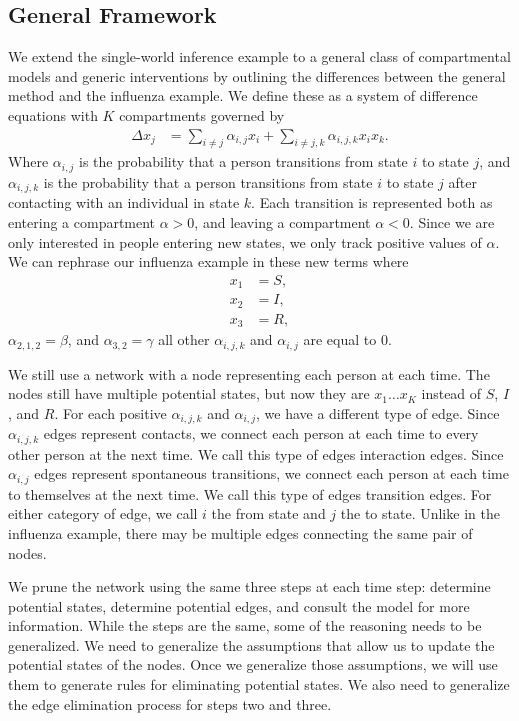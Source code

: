 \documentclass[PTRSB]{rsos}
\begin{document}
\begin{multicols}{2}
\subsection{General Framework}\label{subsection:general}

We extend the single-world inference example to a general class of compartmental models and generic interventions by outlining the differences between the general method and the influenza example.
We define these as a system of difference equations with $K$ compartments governed by 
\begin{align*}
\Delta x_{j} &= \sum_{i \neq j} \alpha_{i,j}x_i + \sum_{i \neq j, k} \alpha_{i,j,k} x_ix_k.
\end{align*}
Where $\alpha_{i,j}$ is the probability that a person transitions from state $i$ to state $j$, and $\alpha_{i,j,k}$ is the probability that a person transitions from state $i$ to state $j$ after contacting with an individual in state $k$.
Each transition is represented both as entering a compartment $\alpha > 0$, and leaving a compartment $\alpha < 0$.
Since we are only interested in people entering new states, we only track positive values of $\alpha$.
We can rephrase our influenza example in these new terms where
\begin{align*}
    x_1 &= S, \\
    x_2 &= I, \\
    x_3 &= R,
\end{align*}
$\alpha_{2,1,2} = \beta $, and $\alpha_{3,2} = \gamma$ all other $\alpha_{i,j,k}$ and $\alpha_{i,j}$ are equal to $0$.

We still use a network with a node representing each person at each time.
The nodes still have multiple potential states, but now they are $x_1 \dots x_K$ instead of $S$, $I$, and $R$.
For each positive $\alpha_{i,j,k} $ and $\alpha_{i,j}$, we have a different type of edge.
Since $\alpha_{i,j,k}$ edges represent contacts, we connect each person at each time to every other person at the next time.
We call this type of edges interaction edges.
Since $\alpha_{i,j}$ edges represent spontaneous transitions, we connect each person at each time to themselves at the next time.
We call this type of edges transition edges.
For either category of edge, we call $i$ the from state and $j$ the to state.
Unlike in the influenza example, there may be multiple edges connecting the same pair of nodes.

We prune the network using the same three steps at each time step: determine potential states, determine potential edges, and consult the model for more information.
While the steps are the same, some of the reasoning needs to be generalized.
We need to generalize the assumptions that allow us to update the potential states of the nodes.
Once we generalize those assumptions, we will use them to generate rules for eliminating potential states.
We also need to generalize the edge elimination process for steps two and three.


\end{multicols}
\end{document}
